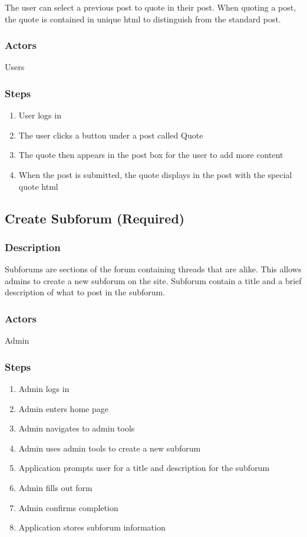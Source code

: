 \documentclass[12pt]{scrartcl}
\begin{document}
The user can select a previous post to quote in their post. When quoting a post, the quote is contained in unique html to distinguish from the standard post. 
\subsubsection{Actors}

Users

\subsubsection{Steps}

\begin{enumerate}
\item User logs in
\item The user clicks a button under a post called Quote
\item The quote then appears in the post box for the user to add more content
\item When the post is submitted, the quote displays in the post with the special quote html
\end{enumerate}

\subsection{Create Subforum (Required)}
\subsubsection{Description}
Subforums are sections of the forum containing threads that are alike. This allows admins to create a new subforum on the site. Subforum contain a title and a brief description of what to post in the subforum.

\subsubsection{Actors}

Admin

\subsubsection{Steps}
\begin {enumerate}
\item Admin logs in
\item Admin enters home page
\item Admin navigates to admin tools
\item Admin uses admin tools to create a new subforum
\item Application prompts user for a title and description for the subforum
\item Admin fills out form
\item Admin confirms completion
\item Application stores subforum information
\end {enumerate}
\end{document}
